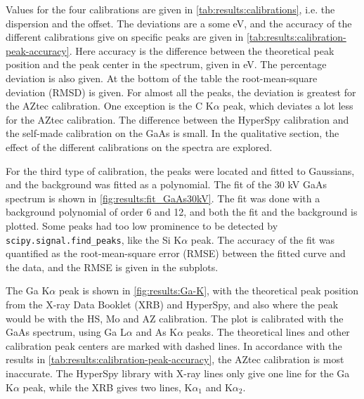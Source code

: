 Values for the four calibrations are given in \cref{tab:results:calibrations}, i.e. the dispersion and the offset.
The deviations are a some eV, and the accuracy of the different calibrations give on specific peaks are given in \cref{tab:results:calibration-peak-accuracy}.
Here accuracy is the difference between the theoretical peak position and the peak center in the spectrum, given in eV.
The percentage deviation is also given.
At the bottom of the table the root-mean-square deviation (RMSD) is given.
For almost all the peaks, the deviation is greatest for the AZtec calibration.
One exception is the C K$\alpha$ peak, which deviates a lot less for the AZtec calibration. %
The difference between the HyperSpy calibration and the self-made calibration on the GaAs is small.
In the qualitative section, the effect of the different calibrations on the spectra are explored.






For the third type of calibration, the peaks were located and fitted to Gaussians, and the background was fitted as a polynomial.
The fit of the 30 kV GaAs spectrum is shown in \cref{fig:results:fit_GaAs30kV}.
The fit was done with a background polynomial of order 6 and 12, and both the fit and the background is plotted.
Some peaks had too low prominence to be detected by \verb|scipy.signal.find_peaks|, like the Si K$\alpha$ peak.
The accuracy of the fit was quantified as the root-mean-square error (RMSE) between the fitted curve and the data, and the RMSE is given in the subplots.


The Ga K$\alpha$ peak is shown in \cref{fig:results:Ga-K}, with the theoretical peak position from the X-ray Data Booklet \cite{thompson_x-ray_2004} (XRB) and HyperSpy, and also where the peak would be with the HS, Mo and AZ calibration.
The plot is calibrated with the GaAs spectrum, using Ga L$\alpha$ and As K$\alpha$ peaks.
The theoretical lines and other calibration peak centers are marked with dashed lines.
In accordance with the results in \cref{tab:results:calibration-peak-accuracy}, the AZtec calibration is most inaccurate.
The HyperSpy library with X-ray lines only give one line for the Ga K$\alpha$ peak, while the XRB gives two lines, K$\alpha_1$ and K$\alpha_2$.

